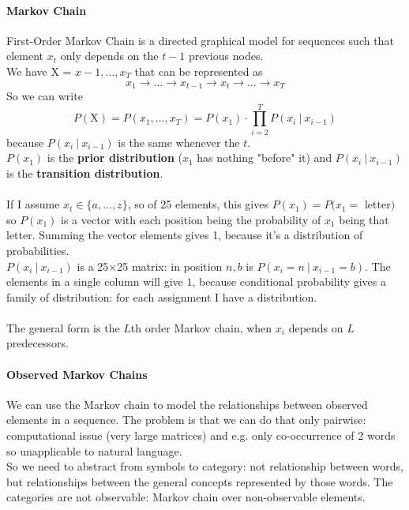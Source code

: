 \documentclass[10pt]{report}
\begin{document}
\paragraph{Markov Chain} First-Order Markov Chain is a directed graphical model for sequences such that element $x_t$ only depends on the $t-1$ previous nodes.\\
We have X = $x-1,\ldots,x_T$ that can be represented as 
$$x_1\rightarrow \ldots\rightarrow x_{t-1}\rightarrow x_t\rightarrow\ldots\rightarrow x_T$$
So we can write $$P(\text{X}) = P(x_1,\ldots,x_T) = P(x_1)\cdot\prod_{i=2}^T P(x_i\:|\:x_{i-1})$$
because $P(x_i\:|\:x_{i-1})$ is the same whenever the $t$.\\
$P(x_1)$ is the \textbf{prior distribution} ($x_1$ has nothing "before" it) and $P(x_i\:|\:x_{i-1})$ is the \textbf{transition distribution}.\\\\
If I assume $x_t\in\{a,\ldots,z\}$, so of 25 elements, this gives $P(x_1) = P(x_1 =$ letter$)$ so $P(x_1)$ is a vector with each position being the probability of $x_1$ being that letter. Summing the vector elements gives 1, because it's a distribution of probabilities.\\
$P(x_i\:|\:x_{i-1})$ is a 25$\times$25 matrix: in position $n,b$ is $P(x_i=n\:|\:x_{i-1}=b)$. The elements in a single column will give $1$, because conditional probability gives a family of distribution: for each assignment I have a distribution.\\\\
The general form is the $L$th order Markov chain, when $x_i$ depends on $L$ predecessors.
\paragraph{Observed Markov Chains} We can use the Markov chain to model the relationships between observed elements in a sequence. The problem is that we can do that only pairwise: computational issue (very large matrices) and e.g. only co-occurrence of 2 words so unapplicable to natural language.\\
So we need to abstract from symbols to category: not relationship between words, but relationships between the general concepts represented by those words. The categories are not observable: Markov chain over non-observable elements.
\end{document}
